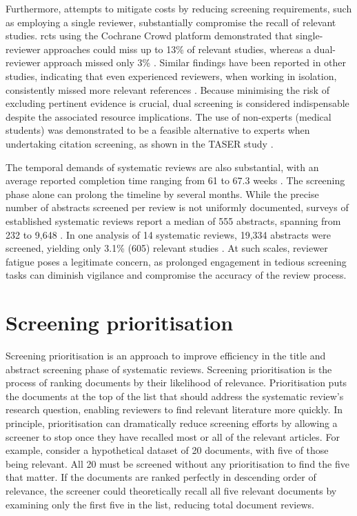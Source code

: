 \documentclass[10pt,oneside]{book}
\begin{document}
Furthermore, attempts to mitigate costs by reducing screening requirements, such as employing a single reviewer, substantially compromise the recall of relevant studies. \glspl*{rct} using the Cochrane Crowd platform demonstrated that single-reviewer approaches could miss up to 13\% of relevant studies, whereas a dual-reviewer approach missed only 3\% \cite{gartlehner_single-reviewer_2020}. Similar findings have been reported in other studies, indicating that even experienced reviewers, when working in isolation, consistently missed more relevant references \cite{waffenschmidt_single_2019}. Because minimising the risk of excluding pertinent evidence is crucial, dual screening is considered indispensable despite the associated resource implications. The use of non-experts (medical students) was demonstrated to be a feasible alternative to experts when undertaking citation screening, as shown in the TASER study \cite{ng_title_2014}.

The temporal demands of systematic reviews are also substantial, with an average reported completion time ranging from 61 to 67.3 weeks \cite{sampson_surveillance_2008, borah_analysis_2017}. The screening phase alone can prolong the timeline by several months. While the precise number of abstracts screened per review is not uniformly documented, surveys of established systematic reviews report a median of 555 abstracts, spanning from 232 to 9,648 \cite{nama_successful_2021}. In one analysis of 14 systematic reviews, 19,334 abstracts were screened, yielding only 3.1\% (605) relevant studies \cite{nama_successful_2021}. At such scales, reviewer fatigue poses a legitimate concern, as prolonged engagement in tedious screening tasks can diminish vigilance and compromise the accuracy of the review process.


\section{Screening prioritisation}\label{sec:screening Priorisation}


Screening prioritisation is an approach to improve efficiency in the title and abstract screening phase of systematic reviews. Screening prioritisation is the process of ranking documents by their likelihood of relevance. Prioritisation puts the documents at the top of the list that should address the systematic review's research question, enabling reviewers to find relevant literature more quickly. In principle, prioritisation can dramatically reduce screening efforts by allowing a screener to stop once they have recalled most or all of the relevant articles. For example, consider a hypothetical dataset of 20 documents, with five of those being relevant. All 20 must be screened without any prioritisation to find the five that matter. If the documents are ranked perfectly in descending order of relevance, the screener could theoretically recall all five relevant documents by examining only the first five in the list, reducing total document reviews. 
\end{document}
